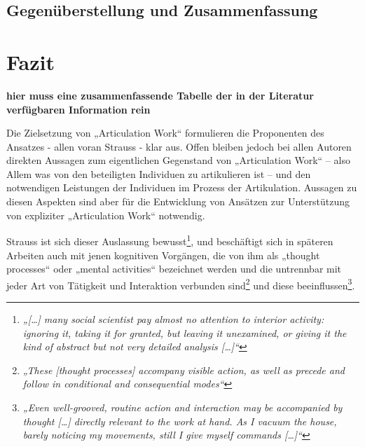 \subsection{Gegenüberstellung und Zusammenfassung} %
\label{sub:gegenüberstellung_und_zusammenfassung}



\section{Fazit} %
\label{sec:fazit}

\textbf{hier muss eine zusammenfassende Tabelle der in der Literatur verfügbaren Information rein}

Die Zielsetzung von „Articulation Work“ formulieren die Proponenten des Ansatzes - allen voran Strauss - klar aus. Offen bleiben jedoch bei allen Autoren direkten Aussagen zum eigentlichen Gegenstand von „Articulation Work“ – also Allem was von den beteiligten Individuen zu artikulieren ist – und den notwendigen Leistungen der Individuen im Prozess der Artikulation. Aussagen zu diesen Aspekten sind aber für die Entwicklung von Ansätzen zur Unterstützung von expliziter „Articulation Work“ notwendig. 

Strauss ist sich dieser Auslassung bewusst\footnote{\emph{„[\ldots] many social scientist pay almost no attention to interior activity: ignoring it, taking it for granted, but leaving it unexamined, or giving it the kind of abstract but not very detailed analysis [\ldots]“}\citep[][S. 131]{Strauss93}}, und beschäftigt sich in späteren Arbeiten \citep{Strauss93} auch mit jenen kognitiven Vorgängen, die von ihm als „thought processes“ oder „mental activities“ bezeichnet werden und die untrennbar mit jeder Art von Tätigkeit und Interaktion verbunden sind\footnote{\emph{„These [thought processes] accompany visible action, as well as precede and follow in conditional and consequential modes“}\citep[][S. 146]{Strauss93}} und diese beeinflussen\footnote{\emph{„Even well-grooved, routine action and interaction may be accompanied by thought [\ldots] directly relevant to the work at hand. As I vacuum the house, barely noticing my movements, still I give myself commands [\ldots]“}\citep[][S. 132]{Strauss93}}. 


